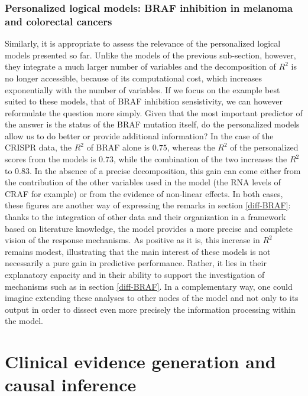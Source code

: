 \documentclass[a4paper,12pt,twoside,onecolumn,openright,final,oldfontcommands]{memoir}
\begin{document}
\subsection{Personalized logical models: BRAF inhibition in melanoma and
colorectal
cancers}\label{personalized-logical-models-braf-inhibition-in-melanoma-and-colorectal-cancers}

Similarly, it is appropriate to assess the relevance of the personalized
logical models presented so far. Unlike the models of the previous
sub-section, however, they integrate a much larger number of variables
and the decomposition of \(R^2\) is no longer accessible, because of its
computational cost, which increases exponentially with the number of
variables. If we focus on the example best suited to these models, that
of BRAF inhibition sensistivity, we can however reformulate the question
more simply. Given that the most important predictor of the answer is
the status of the BRAF mutation itself, do the personalized models allow
us to do better or provide additional information? In the case of the
CRISPR data, the \(R^2\) of BRAF alone is \(0.75\), whereas the \(R^2\)
of the personalized scores from the models is \(0.73\), while the
combination of the two increases the \(R^2\) to \(0.83\). In the absence
of a precise decomposition, this gain can come either from the
contribution of the other variables used in the model (the RNA levels of
CRAF for example) or from the evidence of non-linear effects. In both
cases, these figures are another way of expressing the remarks in
section \ref{diff-BRAF}: thanks to the integration of other data and
their organization in a framework based on literature knowledge, the
model provides a more precise and complete vision of the response
mechanisms. As positive as it is, this increase in \(R^2\) remains
modest, illustrating that the main interest of these models is not
necessarily a pure gain in predictive performance. Rather, it lies in
their explanatory capacity and in their ability to support the
investigation of mechanisms such as in section \ref{diff-BRAF}. In a
complementary way, one could imagine extending these analyses to other
nodes of the model and not only to its output in order to dissect even
more precisely the information processing within the model.

\chapter{Clinical evidence generation and causal
inference}\label{clinical-evidence-generation-and-causal-inference}
\end{document}
